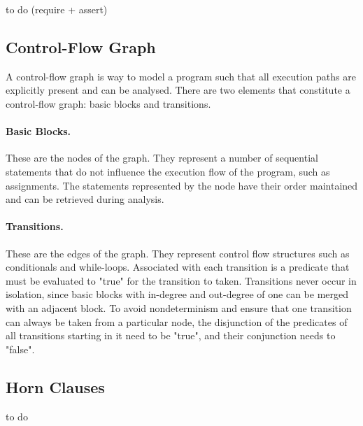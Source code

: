 

to do (require + assert)


\subsection{Control-Flow Graph}

A control-flow graph is way to model a program such that all execution paths are explicitly present and can be analysed. There are two elements that constitute a control-flow graph: basic blocks and transitions.

\paragraph{Basic Blocks.} These are the nodes of the graph. They represent a number of sequential statements that do not influence the execution flow of the program, such as assignments. The statements represented by the node have their order maintained and can be retrieved during analysis.

\paragraph{Transitions.} These are the edges of the graph. They represent control flow structures such as conditionals and while-loops. Associated with each transition is a predicate that must be evaluated to "true" for the transition to taken. Transitions never occur in isolation, since basic blocks with in-degree and out-degree of one can be merged with an adjacent block. To avoid nondeterminism and ensure that one transition can always be taken from a particular node, the disjunction of the predicates of all transitions starting in it need to be "true", and their conjunction needs to "false".


\subsection{Horn Clauses}

to do